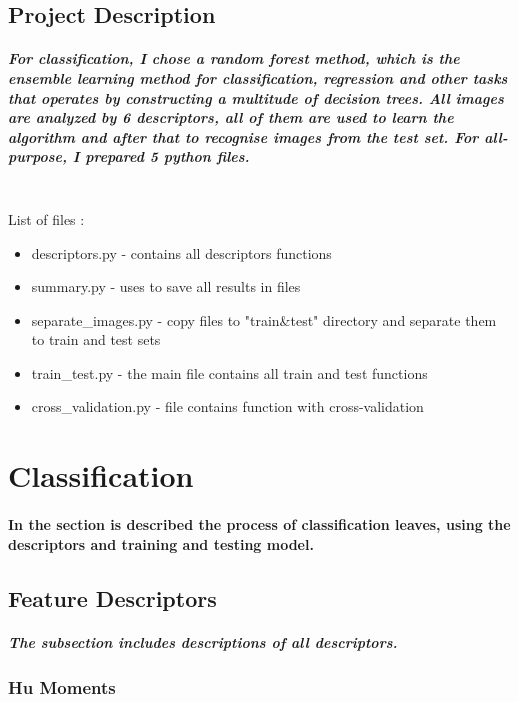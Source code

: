 \documentclass[12pt]{article}
\begin{document}
\subsection{Project Description}

\subparagraph{
For classification, I chose a random forest method, which is the ensemble learning method for classification, regression and other tasks that operates by constructing a multitude of decision trees. All images are analyzed by 6 descriptors, all of them are used to learn the algorithm and after that to recognise images from the test set. For all-purpose, I prepared 5 python files.\\\\
}

List of files :
\begin{itemize}
\item descriptors.py - contains all descriptors functions
\item summary.py - uses to save all results in files
\item separate\_images.py - copy files to "train\&test" directory and separate them to train and test sets
\item train\_test.py - the main file contains all train and test functions
\item cross\_validation.py - file contains function with cross-validation
\end{itemize}

\newpage

\section{Classification}

\paragraph{
In the section is described the process of classification leaves, using the descriptors and training and testing model.
}

\subsection{Feature Descriptors}

\subparagraph{
The subsection includes descriptions of all descriptors.
}

\subsubsection{Hu Moments}
\end{document}
